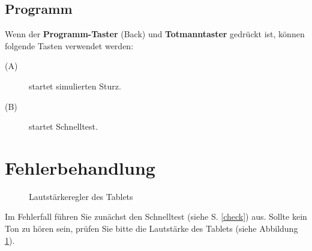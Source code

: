 \documentclass[11pt]{article} %
\begin{document}
\subsection{Programm}
Wenn der \textbf{Programm-Taster} (Back) und \textbf{Totmanntaster} gedrückt ist, können folgende Tasten verwendet werden:
\begin{description}
	\item[(A)] startet simulierten Sturz.
	\item[(B)] startet Schnelltest.
\end{description}

\section{Fehlerbehandlung}

\begin{figure}[h]
\centering
{}
	\caption{Lautstärkeregler des Tablets}
	\label{volume}
\end{figure}

Im Fehlerfall führen Sie zunächst den Schnelltest (siehe S. \ref{check}) aus.
Sollte kein Ton zu hören sein, prüfen Sie bitte die Lautstärke des Tablets (siehe Abbildung \ref{volume}).
\end{document}
